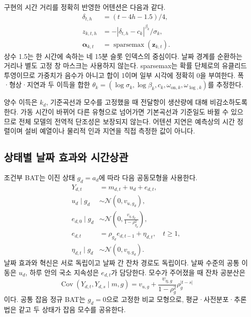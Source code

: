 \documentclass[letterpaper]{article}
\begin{document}
구현의 시간 거리를 정확히 반영한 어텐션은 다음과 같다.
\begin{equation}
\begin{split}
\delta_{t,h}&=(t-4h-1.5)/4,\\
z_{k,t,h}&=-|\delta_{t,h}-c_k|^{\beta_k}/\sigma_k,\\
\boldsymbol\alpha_{k,t}&=\operatorname{sparsemax}(\boldsymbol z_{k,t}).
\end{split}
\label{eq:attention}
\end{equation}
상수 1.5는 한 시간에 속하는 네 15분 슬롯 인덱스의 중심이다. 날짜 경계를 순환하는 거리나 별도 고정 창 마스크는 사용하지 않는다. sparsemax는 확률 단체로의 유클리드 투영이므로 가중치가 음수가 아니고 합이 1이며 일부 시각에 정확히 0을 부여한다. 폭·형상·지연과 두 이득을 합한 $\theta_k=(\log\sigma_k,\log\beta_k,c_k,\omega_{\mathrm{on},k},\omega_{\log,k})$를 추정한다.

양수 이득은 $k_d$, 기준곡선과 모수를 고정했을 때 전달항이 생산량에 대해 비감소하도록 한다. 가동 시간이 바뀌어 다른 유형으로 넘어가면 기본곡선과 기준일도 바뀔 수 있으므로 전체 모델의 전역적 단조성은 보장되지 않는다. 어텐션 지연은 예측상의 시간 정렬이며 설비 예열이나 물리적 인과 지연을 직접 측정한 값이 아니다.

\subsection{상태별 날짜 효과와 시간상관}
조건부 BAT는 이진 상태 $g_d=a_d$에 따라 다음 공동모형을 사용한다.
\begin{equation}
\begin{aligned}
Y_{d,t}&=m_{d,t}+u_d+e_{d,t},\\
u_d\mid g_d&\sim\mathcal N(0,v_{u,g_d}),\\
e_{d,0}\mid g_d&\sim\mathcal N\!\left(0,\frac{v_{\eta,g_d}}{1-\rho_{g_d}^2}\right),\\
e_{d,t}&=\rho_{g_d}e_{d,t-1}+\eta_{d,t},\quad t\ge1,\\
\eta_{d,t}\mid g_d&\sim\mathcal N(0,v_{\eta,g_d}).
\end{aligned}
\label{eq:joint}
\end{equation}
날짜 효과와 혁신은 서로 독립이고 날짜 간 잔차 경로도 독립이다. 날짜 수준의 공통 이동은 $u_d$, 하루 안의 국소 지속성은 $e_{d,t}$가 담당한다. 모수가 주어졌을 때 잔차 공분산은
\begin{equation}
\operatorname{Cov}(Y_{d,t},Y_{d,s}\mid m,g)
=v_{u,g}+\frac{v_{\eta,g}}{1-\rho_g^2}\rho_g^{|t-s|}
\label{eq:cov}
\end{equation}
이다. 공통 잡음 정규 BAT는 $g_d=0$으로 고정한 비교 모형으로, 평균·사전분포·추론법은 같고 두 상태가 잡음 모수를 공유한다.
\end{document}
